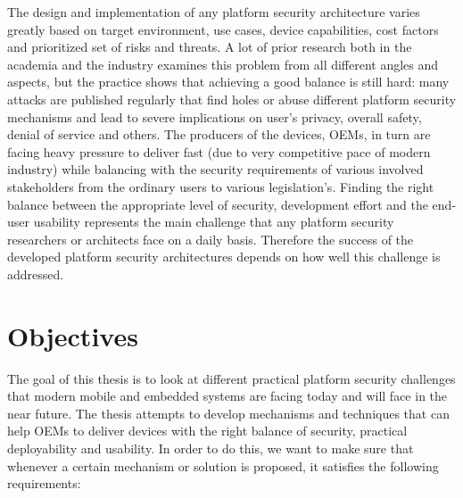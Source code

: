The design and implementation of any platform security architecture varies greatly based on target environment, use cases, device capabilities, cost factors and prioritized set of risks and threats. A lot of prior research both in the academia and the industry examines this problem from all different angles and aspects, but the practice shows that achieving a good balance is still hard: many attacks are published regularly that find holes or abuse different platform security mechanisms and lead to severe implications on user's privacy, overall safety, denial of service and others. The producers of the devices, OEMs, in turn are facing heavy pressure to deliver fast (due to very competitive pace of modern industry) while balancing with the security requirements of various involved stakeholders from the ordinary users to various legislation’s. Finding the right balance between the appropriate level of security, development effort and the end-user usability represents the main challenge that any platform security researchers or architects face on a daily basis. Therefore the success of the developed platform security architectures depends on how well this challenge is addressed.   

\section{Objectives}
\label{sec:Objectives}

The goal of this thesis is to look at different practical platform security challenges that modern mobile and embedded systems are facing today and will face in the near future. The thesis attempts to develop mechanisms and techniques that can help OEMs to deliver devices with the right balance of security, practical deployability and usability. In order to do this, we want to make sure that whenever a certain mechanism or solution is proposed, it satisfies the following requirements:

